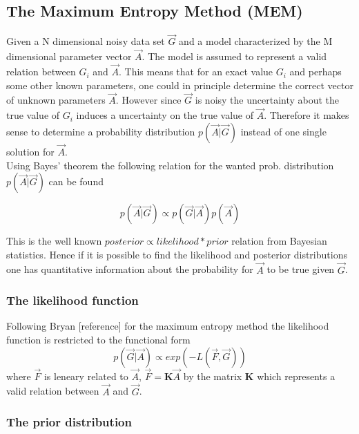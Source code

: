 \subsection{The Maximum Entropy Method (MEM)}

Given a N dimensional noisy data set $\vec{G}$ and a model characterized by the M dimensional parameter vector $\vec{A}$. 
The model is assumed to represent a valid relation between $G_{i}$ and $\vec{A}$. This means that for an exact value $G_{i}$ 
and perhaps some other known parameters, one could in principle determine the correct vector of unknown parameters $\vec{A}$. 
However since $\vec{G}$ is noisy the uncertainty 
about the true value of $G_{i}$ induces a uncertainty on the true value of $\vec{A}$. Therefore it makes sense to determine 
a probability distribution $p(\vec{A}|\vec{G})$ instead of one single solution for $\vec{A}$. \\
Using Bayes' theorem the following relation for the wanted prob. distribution $p(\vec{A}|\vec{G})$ can be found

\begin{displaymath}
 p(\vec{A}|\vec{G}) \propto p(\vec{G}|\vec{A}) p(\vec{A})
\end{displaymath}

\noindent This is the well known $posterior \propto likelihood * prior$ relation from Bayesian statistics. Hence if it 
is possible to find the likelihood and posterior distributions one has quantitative information about the probability for 
$\vec{A}$ to be true given $\vec{G}$.\\

\subsubsection{The likelihood function}

Following Bryan [reference] for the maximum entropy method the likelihood function is restricted to the functional form 
\begin{displaymath}
 p(\vec{G}|\vec{A}) \propto exp(-L(\vec{F},\vec{G}))
\end{displaymath}
where $\vec{F}$ is leneary related to $\vec{A}$, $\vec{F} = \textbf{K} \vec{A}$ by the matrix \textbf{K} which 
represents a valid relation between $\vec{A}$ and $\vec{G}$.\\

\subsubsection{The prior distribution}

